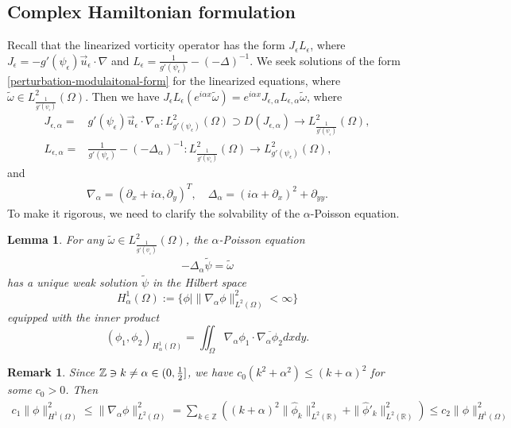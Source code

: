\documentclass[1 [leqno, 11pt]{amsart}
\numberwithin{equation}{section}
\let\ep=\epsilon
\newtheorem{lemma}[Theorem]{Lemma}
\newtheorem{remark}[Theorem]{Remark}
\begin{document}
\begin{CJK*}{GBK}{song}
\subsection{Complex Hamiltonian formulation}
Recall that the   linearized vorticity  operator has the form $ J_\epsilon L_\epsilon$, where
$J_\epsilon = -g'(\psi_\epsilon)\vec{u}_\epsilon\cdot\nabla$ and
 $L_\epsilon = \frac {1} {g'(\psi_\epsilon)} - (-\Delta)^{-1}$. We seek solutions of the form \eqref{perturbation-modulaitonal-form} for the linearized equations, where $\widetilde{\omega} \in L^2_{\frac{1}{g'(\psi_\ep)}}(\Omega)$.  Then we have $J_\epsilon L_\epsilon(e^{i\alpha x}\widetilde{\omega})=e^{i\alpha x}J_{\epsilon,\alpha} L_{\epsilon,\alpha}\widetilde{\omega}$, where
\begin{align}\label{def-J-ep-al}
J_{\epsilon, \alpha} =& g'(\psi_\epsilon)\vec{u}_\epsilon\cdot\nabla_\alpha:L^2_{g'(\psi_\ep)}(\Omega) \supset D(J_{\epsilon, \alpha}) \to L^2_{\frac{1}{g'(\psi_\ep)}}(\Omega),\\\label{def-L-ep-al}
 L_{\epsilon, \alpha} =& \frac {1} {g'(\psi_\epsilon)} - (-\Delta_\alpha)^{-1}:L^2_{\frac{1}{g'(\psi_\ep)}}(\Omega)\to L^2_{g'(\psi_\ep)}(\Omega),\end{align}
and
\begin{align}\label{nabla-alpha-Delta-alpha}
 \nabla_\alpha = (\partial_x + i\alpha, \partial_y)^T,\quad
 \Delta_\alpha  = (i\alpha + \partial_x)^2 + \partial_{yy}.
 \end{align}
To make it rigorous, we need to clarify  the solvability of the  $\alpha$-Poisson equation.
\begin{lemma}
For any $\widetilde{\omega} \in L^2_{\frac{1}{g'(\psi_\ep)}}(\Omega)$, the $\alpha$-Poisson equation
\begin{align}\label{a-Poisson}- \Delta_\alpha \widetilde{\psi} = \widetilde{\omega}\end{align}
has a unique weak solution $\widetilde{\psi}$ in the Hilbert space
$$H^1_\alpha(\Omega) := \{ \phi | \| \nabla_\alpha \phi \|^2_{L^2(\Omega)}< \infty  \}$$
equipped with the inner product
$$(\phi_1, \phi_2)_{H^1_\alpha(\Omega)} = \iint_\Omega \nabla_\alpha \phi_1 \cdot \overline{\nabla_\alpha \phi_2} dxdy.$$
\end{lemma}
\begin{remark}
Since $\mathbb{Z}\ni k\neq\alpha\in (0,{1\over2}]$, we have $c_0(k^2+\alpha^2)\leq (k+\alpha)^2$ for some $c_0>0$. Then
\begin{align*}
c_1\|  \phi \|_{H^1(\Omega)}^2\leq \| \nabla_\alpha \phi \|^2_{L^2(\Omega)}=\sum_{k\in\mathbb{Z}}\left((k+\alpha)^2\|\widehat{\phi}_k\|_{L^2(\mathbb{R})}^2 +\|\widehat{\phi}'_k\|_{L^2(\mathbb{R})}^2\right)\leq  c_2\|  \phi \|^2_{H^1(\Omega)}

\end{align*}
\end{remark}
\end{CJK*}
\end{document}

